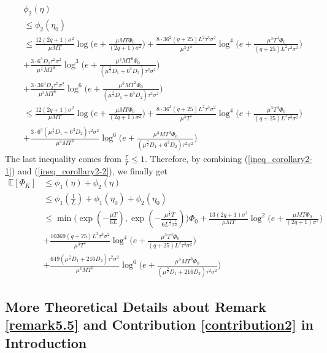 \begin{align} \label{ineq_corollary2-2}
    &\phi_2(\eta) \nonumber\\
    &\leq \phi_2(\eta_0) \nonumber\\
    &\leq \frac{12(2q+1)\sigma^2}{\mu MT}\log\Big(e+\frac{\mu M T \Phi_0}{(2q+1)\sigma^2}\Big) + \frac{8\cdot36^2(q+25)L^2\tau^3\sigma^2}{\mu^3 T^4}\log^4 \Big(e+ \frac{\mu^3 T^4\Phi_0}{(q+25)L^2\tau^3\sigma^2}\Big)\nonumber\\
    &+ \frac{3\cdot6^3 D_1 \tau^2\sigma^2}{\mu^{\frac{3}{2}}MT^3}\log^3\Big(e+\frac{\mu^3 M T^3\Phi_0}{(\mu^{\frac{3}{2}}D_1+6^3 D_2)\tau^2\sigma^2}\Big) \nonumber\\
    &+ \frac{3\cdot36^3 D_2\tau^5\sigma^2}{\mu^3 MT^6} \log^6\Big(e+ \frac{\mu^3 M T^3\Phi_0}{(\mu^{\frac{3}{2}}D_1+6^3 D_2)\tau^2\sigma^2}\Big) \nonumber\\
    &\leq \frac{12(2q+1)\sigma^2}{\mu MT}\log\Big(e+\frac{\mu M T \Phi_0}{(2q+1)\sigma^2}\Big) + \frac{8\cdot36^2(q+25)L^2\tau^3\sigma^2}{\mu^3 T^4}\log^4 \Big(e+ \frac{\mu^3 T^4\Phi_0}{(q+25)L^2\tau^3\sigma^2}\Big) \nonumber\\
    &+ \frac{3\cdot6^3 (\mu^{\frac{3}{2}}D_1+6^3 D_2)\tau^2\sigma^2}{\mu^3 M T^3} \log^6 \Big(e + \frac{\mu^3 M T^3\Phi_0}{(\mu^{\frac{3}{2}}D_1+6^3  D_2)\tau^2\sigma^2}\Big)
\end{align}
The last inequality comes from $\frac{\tau}{T} \leq 1$. Therefore, by combining (\ref{ineq_corollary2-1}) and (\ref{ineq_corollary2-2}), we finally get
\begin{align*}
    \mathbb{E}[\Phi_K] &\leq \phi_1(\eta) + \phi_2(\eta) \\
    &\leq \phi_1(\frac{1}{L}) + \phi_1(\eta_0) + \phi_2(\eta_0) \\
    &\leq \min \Big( \exp(-\frac{\mu T}{6L}), \exp(-\frac{\mu^{\frac{1}{2}}T}{6 L^{\frac{1}{2}}\tau^{\frac{1}{2}}})\Big) \Phi_0 + \frac{13(2q+1)\sigma^2}{\mu MT} \log^2 \Big(e+\frac{\mu M T \Phi_0}{(2q+1)\sigma^2}\Big) \\
        &+ \frac{10369(q+25)L^2\tau^3\sigma^2}{\mu^3 T^4}\log^4 \Big(e+ \frac{\mu^3 T^4\Phi_0}{(q+25)L^2\tau^3\sigma^2}\Big) \\
        &+ \frac{649(\mu^{\frac{3}{2}}D_1+216D_2)\tau^2\sigma^2}{\mu^3 M T^3} \log^6 \Big(e + \frac{\mu^3 M T^3\Phi_0}{(\mu^{\frac{3}{2}}D_1+216 D_2)\tau^2\sigma^2}\Big)
\end{align*}

\subsection{More Theoretical Details about Remark \ref{remark5.5} and Contribution \ref{contribution2} in Introduction}%
\label{app:fedcomgate}

